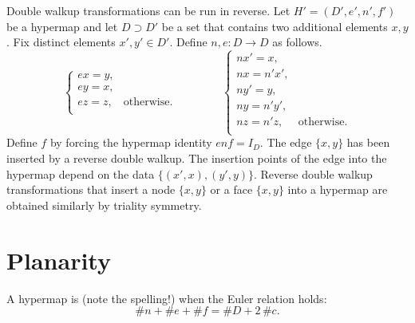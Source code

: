 \begin{remark}\label{rem:reverse-double-walkup}
Double walkup transformations can be run in reverse.
Let $H'=(D',e',n',f')$ be
a hypermap and let $D\supset D'$ be a set that contains two additional elements
$x,y$.  Fix distinct elements $x',y'\in D'$.  Define $n,e:D\to D$ as follows.
\begin{displaymath}
\begin{cases} 
e x = y, &\\
e y = x,&\\
e z = z,&\text{otherwise.}\\
\end{cases}
\qquad\qquad
\begin{cases} 
n x' = x, &\\
n x =  n' x',&\\
n y' = y,&\\
n y =  n' y',&\\
n z = n' z, &\text{otherwise.}\\
\end{cases}
\end{displaymath}
Define $f$ by forcing the hypermap identity $e n f = I_D$.  
The edge $\{x,y\}$ has been inserted by a reverse double walkup.  The insertion points of the edge
into the hypermap
depend on the data $\{(x',x),(y',y)\}$.   Reverse double walkup transformations that
insert a node $\{x,y\}$ or a face $\{x,y\}$ into a hypermap are obtained similarly  by triality symmetry.
%
\end{remark}



\section{Planarity}
%
%

\begin{definition}[planar]  A hypermap is  (note the
spelling!) when the Euler relation holds:
\begin{displaymath}\# n + \# e + \# f = \# D + 2\, \#c.\end{displaymath}
%
\end{definition}


